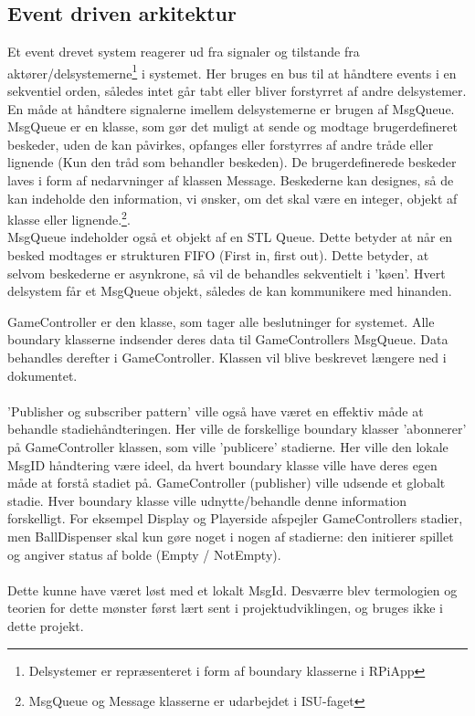 \documentclass[Softwaredesign/Softwaredesign_main.tex]{subfiles}
\begin{document}
\subsection{Event driven arkitektur}\label{sec:EventDriven}
Et event drevet system reagerer ud fra signaler og tilstande fra aktører/delsystemerne\footnote{Delsystemer er repræsenteret i form af boundary klasserne i RPiApp} i systemet. 
Her bruges en bus til at håndtere events i en sekventiel orden, således intet går tabt eller bliver forstyrret af andre delsystemer. 
\\En måde at håndtere signalerne imellem delsystemerne er brugen af MsgQueue. MsgQueue er en klasse, som gør det muligt at sende og modtage brugerdefineret beskeder, uden de kan påvirkes, opfanges eller forstyrres af andre tråde eller lignende (Kun den tråd som behandler beskeden). De brugerdefinerede beskeder laves i form af nedarvninger af klassen Message. Beskederne kan designes, så de kan indeholde den information, vi ønsker, om det skal være en integer, objekt af klasse eller lignende.\footnote{MsgQueue og Message klasserne er udarbejdet i ISU-faget}. 
\\MsgQueue indeholder også et objekt af en STL Queue. Dette betyder at når en besked modtages er strukturen FIFO (First in, first out). Dette betyder, at selvom beskederne er asynkrone, så vil de behandles sekventielt i 'køen'. Hvert delsystem får et MsgQueue objekt, således de kan kommunikere med hinanden.

GameController er den klasse, som tager alle beslutninger for systemet. Alle boundary klasserne indsender deres data til GameControllers MsgQueue. Data behandles derefter i GameController. Klassen vil blive beskrevet længere ned i dokumentet. 
\\\\'Publisher og subscriber pattern' ville også have været en effektiv måde at behandle stadiehåndteringen. Her ville de forskellige boundary klasser 'abonnerer' på GameController klassen, som ville 'publicere' stadierne. Her ville den lokale MsgID håndtering være ideel, da hvert boundary klasse ville have deres egen måde at forstå stadiet på. GameController (publisher) ville udsende et globalt stadie. Hver boundary klasse ville udnytte/behandle denne information forskelligt. For eksempel Display og Playerside afspejler GameControllers stadier, men BallDispenser skal kun gøre noget i nogen af stadierne: den initierer spillet og angiver status af bolde (Empty / NotEmpty).
\\\\Dette kunne have været løst med et lokalt MsgId. Desværre blev termologien og teorien for dette mønster først lært sent i projektudviklingen, og bruges ikke i dette projekt. 
\end{document}
